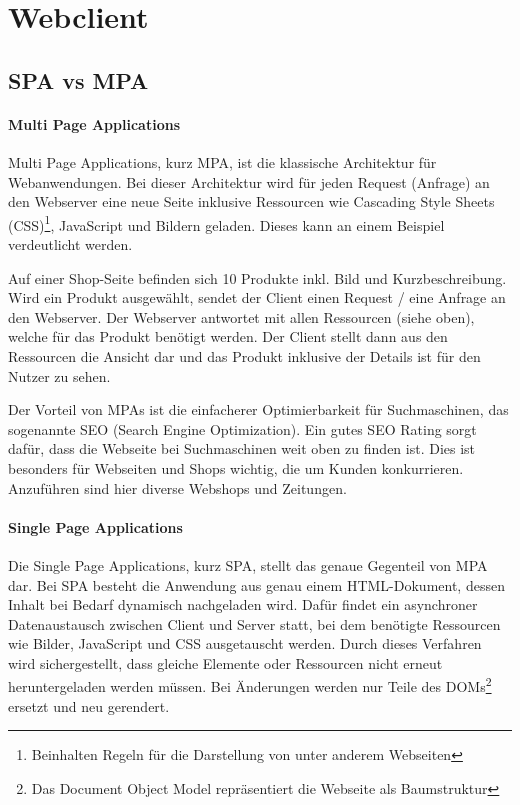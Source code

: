 \section{Webclient} \label{sec:Webclient}
\subsection{SPA vs MPA} \label{subsec:SPA_vs_MPA}

\paragraph{Multi  Page Applications} \label{para:Multi_Page_Applications}
Multi Page Applications, kurz MPA, ist die klassische Architektur für Webanwendungen. Bei dieser Architektur wird für jeden Request (Anfrage) an den Webserver eine neue Seite inklusive Ressourcen wie Cascading Style Sheets (CSS)\footnote{Beinhalten Regeln für die Darstellung von unter anderem Webseiten}, JavaScript und Bildern geladen. Dieses kann an einem Beispiel verdeutlicht werden.

Auf einer Shop-Seite befinden sich 10 Produkte inkl. Bild und Kurzbeschreibung. Wird ein Produkt ausgewählt, sendet der Client einen Request / eine Anfrage an den Webserver. Der Webserver antwortet mit allen Ressourcen (siehe oben), welche für das Produkt benötigt werden. Der Client stellt dann aus den Ressourcen die Ansicht dar und das Produkt inklusive der Details ist für den Nutzer zu sehen.

Der Vorteil von MPAs ist die einfacherer Optimierbarkeit für Suchmaschinen, das sogenannte SEO (Search Engine Optimization). Ein gutes SEO Rating sorgt dafür, dass die Webseite bei Suchmaschinen weit oben zu finden ist. Dies ist besonders für Webseiten und Shops wichtig, die um Kunden konkurrieren. Anzuführen sind hier diverse Webshops und Zeitungen.

\paragraph{Single Page Applications} \label{para:Single_Page_Applications}
Die Single Page Applications, kurz SPA, stellt das genaue Gegenteil von MPA dar. Bei SPA besteht die Anwendung aus genau einem HTML-Dokument, dessen Inhalt bei Bedarf dynamisch nachgeladen wird. Dafür findet ein asynchroner Datenaustausch zwischen Client und Server statt, bei dem benötigte Ressourcen wie Bilder, JavaScript und CSS ausgetauscht werden. Durch dieses Verfahren wird sichergestellt, dass gleiche Elemente oder Ressourcen nicht erneut heruntergeladen werden müssen. Bei Änderungen werden nur Teile des DOMs\footnote{Das Document Object Model repräsentiert die Webseite als Baumstruktur} ersetzt und neu gerendert.

